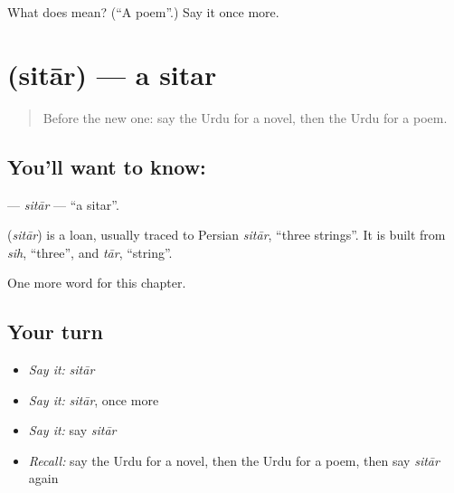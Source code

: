 \begin{tcolorbox}[breakable,colback=teal!4,colframe=teal!35!black,title={Before you move on}]
What does  mean? (\textquotedblleft{}A poem\textquotedblright{}.) Say it once more.
\end{tcolorbox}
\section[\texorpdfstring{\ur{ستار} (sitār)}{ستار (sitār)}]{ (sitār) — a sitar}

\label{lesson:UR-C254-sitar}



\begin{quote}
Before the new one: say the Urdu for a novel, then the Urdu for a poem.
\end{quote}

\subsection*{You'll want to know: }
\textbf{} — \emph{sitār} — \textquotedblleft{}a sitar\textquotedblright{}.

\begin{cousinweb}
\textbf{} (\emph{sitār}) is a loan, usually traced to Persian \emph{sitār}, \textquotedblleft{}three strings\textquotedblright{}. It is built from \emph{sih}, \textquotedblleft{}three\textquotedblright{}, and \emph{tār}, \textquotedblleft{}string\textquotedblright{}.
\end{cousinweb}

\begin{grammarlens}[title={What you've built}]
One more word for this chapter.
\end{grammarlens}

\subsection*{Your turn}
\begin{itemize}
\raggedright
  \item \emph{Say it:} \emph{sitār}
  \item \emph{Say it:} \emph{sitār}, once more
  \item \emph{Say it:} say \emph{sitār}
  \item \emph{Recall:} say the Urdu for a novel, then the Urdu for a poem, then say \emph{sitār} again
\end{itemize}

